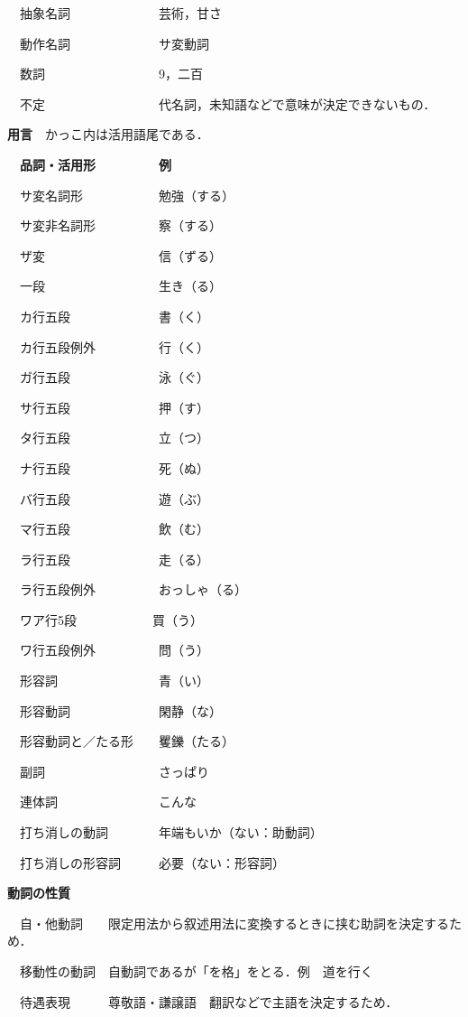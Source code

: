 \documentclass[japanese]{jnlp_1.4}
\begin{document}
　抽象名詞　　　　　　　芸術，甘さ

　動作名詞　　　　　　　サ変動詞

　数詞　　　　　　　　　9，二百

　不定　　　　　　　　　代名詞，未知語などで意味が決定できないもの．

{\bfseries 用言}　かっこ内は活用語尾である．

　{\bfseries 品詞・活用形　　　　　例}

　サ変名詞形　　　　　　勉強（する）

　サ変非名詞形　　　　　察（する）

　ザ変　　　　　　　　　信（ずる）

　一段　　　　　　　　　生き（る）

　カ行五段　　　　　　　書（く）

　カ行五段例外　　　　　行（く）

　ガ行五段　　　　　　　泳（ぐ）

　サ行五段　　　　　　　押（す）

　タ行五段　　　　　　　立（つ）

　ナ行五段　　　　　　　死（ぬ）

　バ行五段　　　　　　　遊（ぶ）

　マ行五段　　　　　　　飲（む）

　ラ行五段　　　　　　　走（る）

　ラ行五段例外　　　　　おっしゃ（る）

　ワア行5段　　　　　　買（う）

　ワ行五段例外　　　　　問（う）

　形容詞　　　　　　　　青（い）

　形容動詞　　　　　　　閑静（な）

　形容動詞と／たる形　　矍鑠（たる）

　副詞　　　　　　　　　さっぱり

　連体詞　　　　　　　　こんな

　打ち消しの動詞　　　　年端もいか（ない：助動詞）

　打ち消しの形容詞　　　必要（ない：形容詞）

{\bfseries 動詞の性質}

　自・他動詞　　限定用法から叙述用法に変換するときに挟む助詞を決定するため．

　移動性の動詞　自動詞であるが「を格」をとる．例　道を行く

　待遇表現　　　尊敬語・謙譲語　翻訳などで主語を決定するため．
\end{document}
